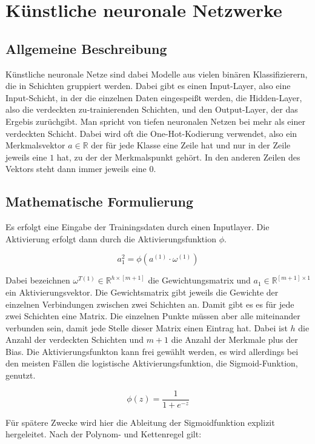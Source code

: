 \documentclass[11pt]{article} %
\begin{document}
\section{Künstliche neuronale Netzwerke}
\subsection{Allgemeine Beschreibung}
Künstliche neuronale Netze sind dabei Modelle aus vielen binären Klassifizierern, die in Schichten gruppiert werden. Dabei gibt es einen Input-Layer, also eine Input-Schicht, in der die einzelnen Daten eingespeißt werden, die Hidden-Layer, also die verdeckten zu-trainierenden Schichten,  und den Output-Layer, der das Ergebis zurüchgibt. Man spricht von tiefen neuronalen Netzen bei mehr als einer verdeckten Schicht. Dabei wird oft die One-Hot-Kodierung verwendet, also ein Merkmalsvektor $a \in \mathbb{R}$ der für jede Klasse eine Zeile hat und nur in der Zeile jeweils eine $1$ hat, zu der der Merkmalspunkt gehört. In den anderen Zeilen des Vektors steht dann immer jeweils eine $0$.  
\subsection{Mathematische Formulierung}
Es erfolgt eine Eingabe der Trainingsdaten durch einen Inputlayer. Die Aktivierung erfolgt dann durch die Aktivierungsfunktion $\phi$.

\begin{equation}
 a^{2}_1 = \phi(a^{(1)} \cdot \omega^{(1)} )
\end{equation}

Dabei bezeichnen $\omega^{T (1)} \in \mathbb{R}^{h \times [m+1]}$ die Gewichtungsmatrix und $a_1 \in \mathbb{R}^{[m+1] \times 1}$ ein Aktivierungsvektor. Die Gewichtsmatrix gibt jeweils die Gewichte der einzelnen Verbindungen zwischen zwei Schichten an. Damit gibt es es für jede zwei Schichten eine Matrix. Die einzelnen Punkte müssen aber alle miteinander verbunden sein, damit jede Stelle dieser Matrix einen Eintrag hat. Dabei ist $h$ die Anzahl der verdeckten Schichten und $m+1$ die Anzahl der Merkmale plus der Bias.
Die Aktivierungsfunkton kann frei gewählt werden, es wird allerdings bei den meisten Fällen die logistische Aktivierungsfunktion, die Sigmoid-Funktion, genutzt.

\begin{equation}
\phi(z) = \frac{1}{1+e^{-z}}
\end{equation}

Für spätere Zwecke wird hier die Ableitung der Sigmoidfunktion explizit hergeleitet. Nach der Polynom- und Kettenregel gilt:
\end{document}
